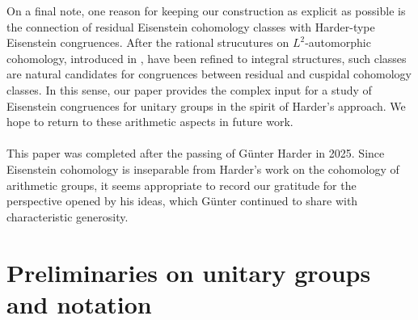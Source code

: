 \documentclass[a4paper,10pt]{amsart}
\theoremstyle{definition}
\numberwithin{equation}{section}
\begin{document}
On a final note, one reason for keeping our construction as explicit as possible is the connection of residual Eisenstein cohomology classes with Harder-type Eisenstein congruences. After the rational strucutures on $L^2$-automorphic cohomology, introduced in \cite{nairrai}, have been refined to integral structures, such classes are natural candidates for congruences between residual and cuspidal cohomology classes. In this sense, our paper provides the complex input for a study of Eisenstein congruences for unitary groups in the spirit of Harder's approach. We hope to return to these arithmetic aspects in future work.\\\\
\small
{}\enlargethispage{1cm}
This paper was completed after the passing of G\"unter Harder in 2025. Since Eisenstein cohomology is inseparable from Harder's work on the cohomology of arithmetic groups, it seems appropriate to record our gratitude for the perspective opened by his ideas, which G\"unter continued to share with characteristic generosity.
\normalsize





\section{Preliminaries on unitary groups and notation}\label{sect:preliminaries}
\end{document}
